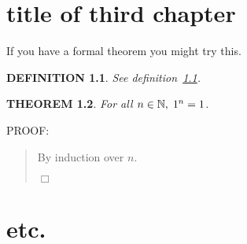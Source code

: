 \documentclass{report}
\newtheorem{theorem}{THEOREM}
\newtheorem{definition}[theorem]{DEFINITION}
\newenvironment{proof}{
PROOF:
\begin{quotation}}{
$\Box$ \end{quotation}}
\newcommand{\nats}{\mbox{\( \mathbb N \)}}
\numberwithin{equation}{section}
\numberwithin{figure}{section}
\numberwithin{table}{section}
\begin{document}
\chapter{title of third chapter}
If you have a formal theorem you might try this.
\begin{definition}\label{def}
See definition~\ref{def}.
\end{definition}
\begin{theorem}
For all $n\in\nats,\; 1^n=1$.
\end{theorem}
\begin{proof}
By induction over $n$.
\end{proof}

\chapter{etc.}
\appendix








\end{document}
